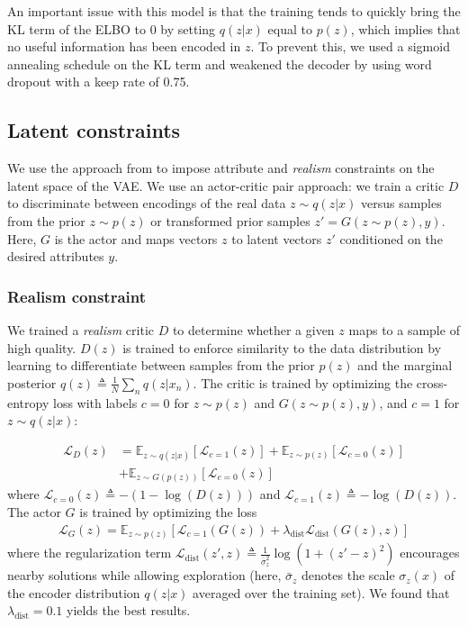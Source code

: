 \documentclass[11pt,letterpaper]{article}
\begin{document}
An important issue with this model is that the training tends to quickly bring the KL term of the ELBO to 0 by setting $q(z|x)$ equal to $p(z)$, which implies that no useful information has been encoded in $z$. To prevent this, we used a sigmoid annealing schedule on the KL term and weakened the decoder by using word dropout \cite{iyyer2015deep,kumar2016ask} with a keep rate of 0.75.


\subsection{Latent constraints}
We use the approach from \cite{engel2017latent} to impose attribute and \textit{realism} constraints on the latent space of the VAE. We use an actor-critic pair approach: we train a critic $D$ to discriminate between encodings of the real data $z \sim q(z|x)$ versus samples from the prior $z \sim p(z)$ or transformed prior samples $z' = G(z \sim p(z),y)$. Here, $G$ is the actor and maps vectors $z$ to latent vectors $z'$ conditioned on the desired attributes $y$.

\subsubsection{Realism constraint}
We trained a \textit{realism} critic $D$ to determine whether a given $z$ maps to a sample of high quality. $D(z)$ is trained to enforce similarity to the data distribution by learning to differentiate between samples from the prior $p(z)$ and the marginal posterior $q(z) \triangleq \frac{1}{N} \sum_n q(z|x_n)$. The critic is trained by optimizing the cross-entropy loss with labels $c=0$ for $z \sim p(z)$ and $G(z \sim p(z), y)$, and $c=1$ for $z \sim q(z|x)$:

\begin{align}
    \mathcal{L}_D(z) &= \mathbb{E}_{z \sim q(z|x)}[\mathcal{L}_{c=1}(z)] + \mathbb{E}_{z \sim p(z)}[\mathcal{L}_{c=0}(z)] \nonumber \\ 
    &+ \mathbb{E}_{z \sim G(p(z))}[\mathcal{L}_{c=0}(z)] 
\end{align}
where $\mathcal{L}_{c=0}(z) \triangleq -(1-\log(D(z)))$ and $\mathcal{L}_{c=1}(z) \triangleq -\log(D(z))$. The actor $G$ is trained by optimizing the loss 
\begin{align}
    \mathcal{L}_G(z) = \mathbb{E}_{z \sim p(z)}[\mathcal{L}_{c=1}(G(z)) + \lambda_{\text{dist}} \mathcal{L}_{\text{dist}}(G(z),z)]
\end{align}
where the regularization term $\mathcal{L}_{\text{dist}}(z',z) \triangleq \frac{1}{\bar{\sigma}_z^2} \log(1+(z'-z)^2)$ encourages nearby solutions while allowing exploration (here, $\bar{\sigma}_z$ denotes the scale $\sigma_z(x)$ of the encoder distribution $q(z|x)$ averaged over the training set). We found that $\lambda_{\text{dist}}=0.1$ yields the best results.
\end{document}

